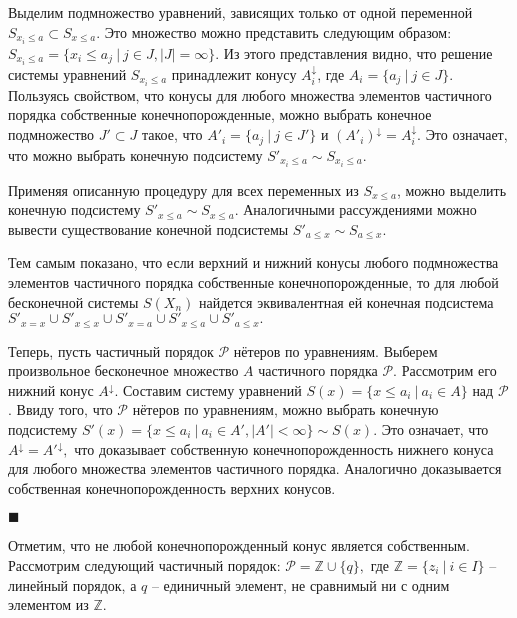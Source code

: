 \documentclass[12pt]{article}
\theoremstyle{break}
\newenvironment{Proof} %
	{\par\noindent{\bf Доказательство.}} %
	{\hfill$\scriptstyle\blacksquare$} %
\def\P{\mathcal{P}}
\begin{document}
\begin{Proof}
			Выделим подмножество уравнений, зависящих только от одной переменной $S_{x_i\leqslant a}\subset S_{x\leqslant a}$. Это множество можно представить следующим образом: $S_{x_i\leqslant a}=\{x_i\leqslant a_j\ |\ j\in J, |J| = \infty\}.$ Из этого представления видно, что решение системы уравнений $S_{x_i\leqslant a}$ принадлежит конусу $A_i^{\downarrow}$, где $A_i = \{a_j\ |\ j\in J\}$. Пользуясь свойством, что конусы для любого множества элементов частичного порядка собственные конечнопорожденные, можно выбрать конечное подмножество $J'\subset J$ такое, что $A'_i = \{a_j\ |\ j\in J'\}$ и $(A'_i)^{\downarrow} = A_i^{\downarrow}.$ Это означает, что можно выбрать конечную подсистему $S'_{x_i\leqslant a}\sim S_{x_i\leqslant a}$.

			Применяя описанную процедуру для всех переменных из $S_{x\leqslant a}$, можно выделить конечную подсистему $S'_{x\leqslant a}\sim S_{x\leqslant a}.$ Аналогичными рассуждениями можно вывести существование конечной подсистемы $S'_{a\leqslant x}\sim S_{a\leqslant x}.$

			Тем самым показано, что если верхний и нижний конусы любого подмножества элементов частичного порядка собственные конечнопорожденные, то для любой бесконечной системы $S(X_n)$ найдется эквивалентная ей конечная подсистема $S'_{x=x}\cup S'_{x\leqslant x}\cup S'_{x=a}\cup S'_{x\leqslant a}\cup S'_{a\leqslant x}.$  

			Теперь, пусть частичный порядок $\P$ нётеров по уравнениям. Выберем произвольное бесконечное множество $A$ частичного порядка $\P$. Рассмотрим его нижний конус $A^{\downarrow}$. Составим систему уравнений $S(x) = \{x\leqslant a_i\ |\ a_i\in A\}$ над $\P$. Ввиду того, что $\P$ нётеров по уравнениям, можно выбрать конечную подсистему $S'(x)=\{x\leqslant a_i\ |\ a_i\in A', |A'|<\infty\}\sim S(x)$. Это означает, что $A^{\downarrow} = A'^{\downarrow},$ что доказывает собственную конечнопорожденность нижнего конуса для любого множества элементов частичного порядка. Аналогично доказывается собственная конечнопорожденность верхних конусов.

		\end{Proof}

		Отметим, что не любой конечнопорожденный конус является собственным. Рассмотрим следующий частичный порядок: $\P = \mathbb{Z}\cup \{q\},$ где $\mathbb{Z} = \{z_i\ |\ i\in I\}$ -- линейный порядок, а $q$ -- единичный элемент, не сравнимый ни с одним элементом из $\mathbb{Z}.$
\end{document}
